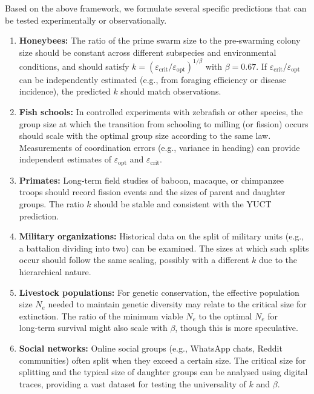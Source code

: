 \documentclass[12pt]{article}
\theoremstyle{remark}
\begin{document}
	Based on the above framework, we formulate several specific predictions that can be tested experimentally or observationally.
	
	\begin{enumerate}
		\item \textbf{Honeybees:} The ratio of the prime swarm size to the pre‑swarming colony size should be constant across different subspecies and environmental conditions, and should satisfy $k = (\varepsilon_{\text{crit}}/\varepsilon_{\text{opt}})^{1/\beta}$ with $\beta = 0.67$. If $\varepsilon_{\text{crit}}/\varepsilon_{\text{opt}}$ can be independently estimated (e.g., from foraging efficiency or disease incidence), the predicted $k$ should match observations.
		
		\item \textbf{Fish schools:} In controlled experiments with zebrafish or other species, the group size at which the transition from schooling to milling (or fission) occurs should scale with the optimal group size according to the same law. Measurements of coordination errors (e.g., variance in heading) can provide independent estimates of $\varepsilon_{\text{opt}}$ and $\varepsilon_{\text{crit}}$.
		
		\item \textbf{Primates:} Long‑term field studies of baboon, macaque, or chimpanzee troops should record fission events and the sizes of parent and daughter groups. The ratio $k$ should be stable and consistent with the YUCT prediction.
		
		\item \textbf{Military organizations:} Historical data on the split of military units (e.g., a battalion dividing into two) can be examined. The sizes at which such splits occur should follow the same scaling, possibly with a different $k$ due to the hierarchical nature.
		
		\item \textbf{Livestock populations:} For genetic conservation, the effective population size $N_e$ needed to maintain genetic diversity may relate to the critical size for extinction. The ratio of the minimum viable $N_e$ to the optimal $N_e$ for long‑term survival might also scale with $\beta$, though this is more speculative.
		
		\item \textbf{Social networks:} Online social groups (e.g., WhatsApp chats, Reddit communities) often split when they exceed a certain size. The critical size for splitting and the typical size of daughter groups can be analysed using digital traces, providing a vast dataset for testing the universality of $k$ and $\beta$.
	\end{enumerate}
	
\end{document}
